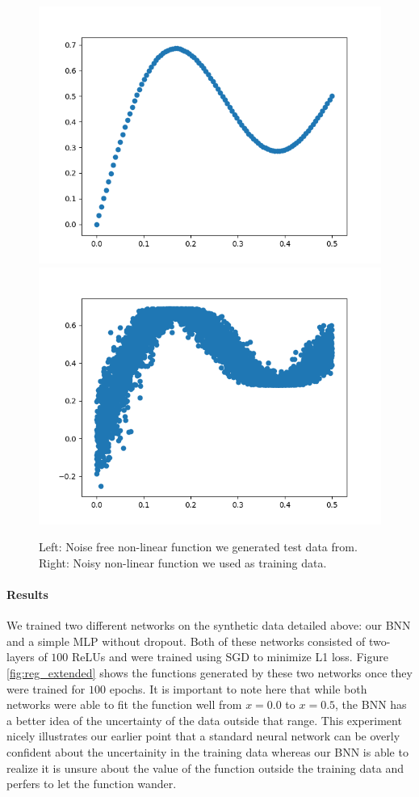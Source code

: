 \documentclass[11pt]{article}
\begin{document}
\begin{figure}
  \centering\includegraphics[width=.45\textwidth]{figures/regression_curve.png}
  \centering\includegraphics[width=.45\textwidth]{figures/regression_curve_with_noise.png}
  \caption{Left: Noise free non-linear function we generated test data from.
  Right: Noisy non-linear function we used as training data.}
  \label{fig:reg_syth_data}
\end{figure}

\paragraph{Results} 
We trained two different networks on the synthetic data detailed above: our BNN
and a simple MLP without dropout. Both of these networks consisted of two-
layers of $100$ ReLUs and were trained using SGD to minimize L1 loss. Figure
\ref{fig:reg_extended} shows the functions generated by these two networks
once they were trained for $100$ epochs. It is important to note here that
while both networks were able to fit the function well from $x=0.0$ to $x=0.5$,
the BNN has a better idea of the uncertainty of the data outside that range.
This experiment nicely illustrates our earlier point that a standard neural
network can be overly confident about the uncertainity in the training data 
whereas our BNN is able to realize it is unsure about the value of the 
function outside the training data and perfers to let the function wander.
\end{document}
